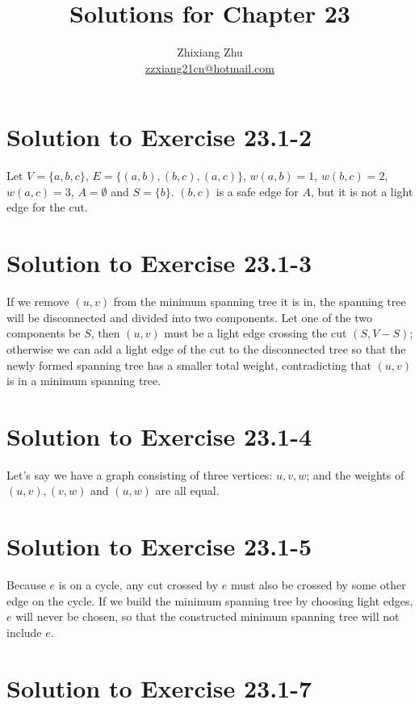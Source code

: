 \documentclass[a4paper, fleqn]{article}
\title{Solutions for Chapter 23}
\author{Zhixiang Zhu  \\\href{mailto:zzxiang21cn@hotmail.com}{zzxiang21cn@hotmail.com}}
\begin{document}
\maketitle

\section*{Solution to Exercise 23.1-2}

Let $V = \{ a, b, c \}$, $E = \{ (a, b), (b, c), (a, c) \}$, $w(a, b) = 1$, $w(b, c) = 2$, $w(a, c) = 3$, $A = \emptyset$ and $S = \{ b \}$. $(b, c)$ is a safe edge for $A$, but it is not a light edge for the cut.


\section*{Solution to Exercise 23.1-3}

If we remove $(u, v)$ from the minimum spanning tree it is in, the spanning tree will be disconnected and divided into two components. Let one of the two components be $S$, then $(u, v)$ must be a light edge crossing the cut $(S, V - S)$; otherwise we can add a light edge of the cut to the disconnected tree so that the newly formed spanning tree has a smaller total weight, contradicting that $(u, v)$ is in a minimum spanning tree.


\section*{Solution to Exercise 23.1-4}

Let's say we have a graph consisting of three vertices: $u, v, w$; and the weights of $(u, v), (v, w)$ and $(u, w)$ are all equal.


\section*{Solution to Exercise 23.1-5}

Because $e$ is on a cycle, any cut crossed by $e$ must also be crossed by some other edge on the cycle. If we build the minimum spanning tree by choosing light edges, $e$ will never be chosen, so that the constructed minimum spanning tree will not include $e$.


\section*{Solution to Exercise 23.1-7}
\end{document}
